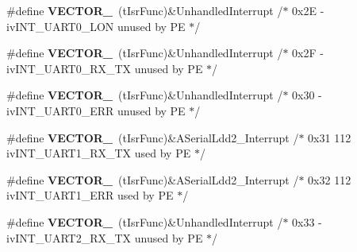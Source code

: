 \begin{DoxyCompactItemize}
\item 
\#define {\bfseries V\+E\+C\+T\+O\+R\+\_}~(t\+Isr\+Func)\&Unhandled\+Interrupt         /$\ast$ 0x2\+E -\/    iv\+I\+N\+T\+\_\+\+U\+A\+R\+T0\+\_\+\+L\+O\+N                unused by P\+E $\ast$/\hypertarget{group___vectors___config__module_ga0955683f6d21817e6fab75c6bf61013b}{}\label{group___vectors___config__module_ga0955683f6d21817e6fab75c6bf61013b}

\item 
\#define {\bfseries V\+E\+C\+T\+O\+R\+\_}~(t\+Isr\+Func)\&Unhandled\+Interrupt         /$\ast$ 0x2\+F -\/    iv\+I\+N\+T\+\_\+\+U\+A\+R\+T0\+\_\+\+R\+X\+\_\+\+T\+X              unused by P\+E $\ast$/\hypertarget{group___vectors___config__module_ga2d2bb8622c5d3201ad156727b38ed7a0}{}\label{group___vectors___config__module_ga2d2bb8622c5d3201ad156727b38ed7a0}

\item 
\#define {\bfseries V\+E\+C\+T\+O\+R\+\_}~(t\+Isr\+Func)\&Unhandled\+Interrupt         /$\ast$ 0x30 -\/    iv\+I\+N\+T\+\_\+\+U\+A\+R\+T0\+\_\+\+E\+R\+R                unused by P\+E $\ast$/\hypertarget{group___vectors___config__module_ga8511505744a449c258dca4b5f1e8ac58}{}\label{group___vectors___config__module_ga8511505744a449c258dca4b5f1e8ac58}

\item 
\#define {\bfseries V\+E\+C\+T\+O\+R\+\_}~(t\+Isr\+Func)\&A\+Serial\+Ldd2\+\_\+\+Interrupt      /$\ast$ 0x31 112  iv\+I\+N\+T\+\_\+\+U\+A\+R\+T1\+\_\+\+R\+X\+\_\+\+T\+X              used by P\+E $\ast$/\hypertarget{group___vectors___config__module_gae4feccebb173bdfa24b10de173fe60b7}{}\label{group___vectors___config__module_gae4feccebb173bdfa24b10de173fe60b7}

\item 
\#define {\bfseries V\+E\+C\+T\+O\+R\+\_}~(t\+Isr\+Func)\&A\+Serial\+Ldd2\+\_\+\+Interrupt      /$\ast$ 0x32 112  iv\+I\+N\+T\+\_\+\+U\+A\+R\+T1\+\_\+\+E\+R\+R                used by P\+E $\ast$/\hypertarget{group___vectors___config__module_gaf27af6b70fcc0cee4d35bf8c93f84fd5}{}\label{group___vectors___config__module_gaf27af6b70fcc0cee4d35bf8c93f84fd5}

\item 
\#define {\bfseries V\+E\+C\+T\+O\+R\+\_}~(t\+Isr\+Func)\&Unhandled\+Interrupt         /$\ast$ 0x33 -\/    iv\+I\+N\+T\+\_\+\+U\+A\+R\+T2\+\_\+\+R\+X\+\_\+\+T\+X              unused by P\+E $\ast$/\hypertarget{group___vectors___config__module_ga266eebadddbcb840603b5f2dbca53e24}{}\label{group___vectors___config__module_ga266eebadddbcb840603b5f2dbca53e24}


\end{DoxyCompactItemize}
